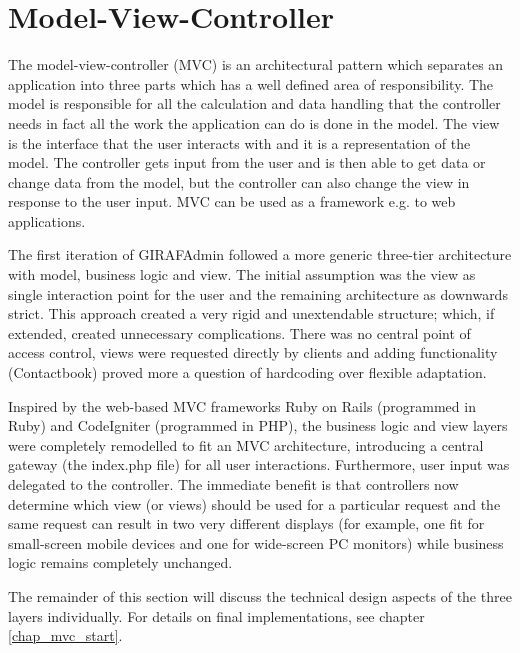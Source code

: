 \section{Model-View-Controller}
The model-view-controller (MVC) is an architectural pattern which separates an application into three parts which has a well defined area of responsibility. The model is responsible for all the calculation and data handling that the controller needs in fact all the work the application can do is done in the model. The view is the interface that the user interacts with and it is a representation of the model. The controller gets input from the user and is then able to get data or change data from the model, but the controller can also change the view in response to the user input\cite{vmc}. MVC can be used as a framework e.g. to web applications.

The first iteration of GIRAFAdmin followed a more generic three-tier architecture with model, business logic and view. The initial assumption was the view as single interaction point for the user and the remaining architecture as downwards strict. This approach created a very rigid and unextendable structure; which, if extended, created unnecessary complications. There was no central point of access control, views were requested directly by clients and adding functionality (Contactbook) proved more a question of hardcoding over flexible adaptation.

Inspired by the web-based MVC frameworks Ruby on Rails (programmed in Ruby) and CodeIgniter (programmed in PHP), the business logic and view layers were completely remodelled to fit an MVC architecture, introducing a central gateway (the index.php file) for all user interactions. Furthermore, user input was delegated to the controller. The immediate benefit is that controllers now determine which view (or views) should be used for a particular request and the same request can result in two very different displays (for example, one fit for small-screen mobile devices and one for wide-screen PC monitors) while business logic remains completely unchanged.

The remainder of this section will discuss the technical design aspects of the three layers individually. For details on final implementations, see chapter \vref{chap_mvc_start}.


